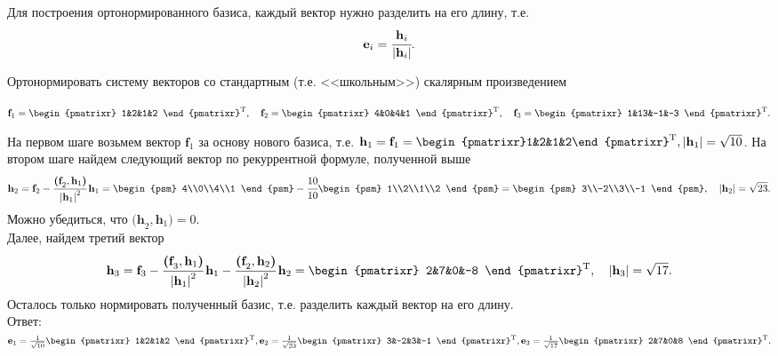 Для построения ортонормированного базиса, каждый вектор нужно разделить на его длину, т.е.
$$
\textbf{e}_i=\cfrac{\textbf{h}_i}{\left|\textbf{h}_i\right|}.
$$
\begin{prim}
	Ортонормировать систему векторов со стандартным (т.е. <<школьным>>) скалярным произведением
	\begin{center}
		$
		\textbf{f}_1 = \begin{pmatrixr}
			1&2&1&2
		\end{pmatrixr}^{\text{T}}, \quad \textbf{f}_2 = \begin{pmatrixr}
		4&0&4&1
		\end{pmatrixr}^{\text{T}}, \quad \textbf{f$_3$} = \begin{pmatrixr}
		1&13&-1&-3
		\end{pmatrixr}^{\text{T}}.
		$
	\end{center}
\end{prim}
На первом шаге возьмем вектор $\textbf{f}_1$ за основу нового базиса, т.е. $\textbf{h}_1 = \textbf{f}_1 =\begin{pmatrixr}1&2&1&2\end{pmatrixr}^{\text{T}}, \abs{\textbf{h}_1} = \sqrt{10}$. На втором шаге найдем следующий вектор по рекуррентной формуле, полученной выше
$$
\textbf{h}_2 = \textbf{f}_2 - \cfrac{\textbf{(f}_2, \textbf{h}_1\textbf{)}}{\abs{\textbf{h}_1}^2}\, \textbf{h}_1=\begin{psm}
4\\0\\4\\1
\end{psm} - \cfrac{10}{10} \begin{psm}
1\\2\\1\\2
\end{psm}=\begin{psm}
3\\-2\\3\\-1
\end{psm}, \quad \abs{\textbf{h}_2} = \sqrt{23}.
$$
Можно убедиться, что $\textbf{(h}_2, \textbf{h}_1\textbf{)} = 0$.\\
Далее, найдем третий вектор
$$
\textbf{h}_3=\textbf{f}_3-\cfrac{\textbf{(f}_3, \textbf{h}_1\textbf{)}}{\abs{\textbf{h}_1}^2}\, \textbf{h}_1-\cfrac{\textbf{(f}_2, \textbf{h}_2\textbf{)}}{\abs{\textbf{h}_2}^2}\, \textbf{h}_2=\begin{pmatrixr}
2&7&0&-8
\end{pmatrixr}^\text{T}, \quad \abs{\textbf{h}_3} = \sqrt{17}.
$$
Осталось только нормировать полученный базис, т.е. разделить каждый вектор на его длину.\\
Ответ:
$\textbf{e}_1=\frac{1}{\sqrt{10}}\begin{pmatrixr}
	1&2&1&2
\end{pmatrixr}^\text{T},
\textbf{e}_2=\frac{1}{\sqrt{23}}\begin{pmatrixr}
3&-2&3&-1
\end{pmatrixr}^\text{T},
\textbf{e}_3=\frac{1}{\sqrt{17}}\begin{pmatrixr}
2&7&0&8
\end{pmatrixr}^\text{T}.
$

